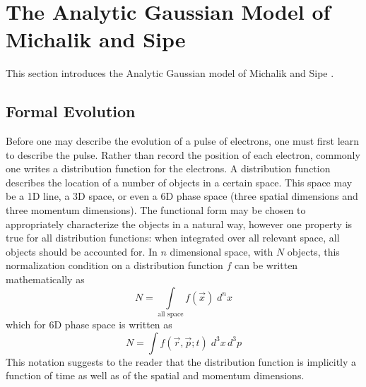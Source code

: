 
\section{The Analytic Gaussian Model of Michalik and Sipe} \label{sec:ms_model}

This section introduces the Analytic Gaussian model of Michalik and Sipe \cite{michalik_analytic_2006}.

\subsection{Formal Evolution} \label{sec:formal_evolution}

Before one may describe the evolution of a pulse of electrons, one must first learn to describe the pulse.
Rather than record the position of each electron, commonly one writes a distribution function for the electrons.
A distribution function describes the location of a number of objects in a certain space.
This space may be a 1D line, a 3D space, or even a 6D phase space (three spatial dimensions and three momentum dimensions).
The functional form may be chosen to appropriately characterize the objects in a natural way, however one property is true for all distribution functions: when integrated over all relevant space, all objects should be accounted for.
In $n$ dimensional space, with $N$ objects, this normalization condition on a distribution function $f$ can be written mathematically as
\begin{equation}
N = \int\limits_{\text{all space}} \!\!\! f(\vec{x}) \; d^{n}x
\end{equation}
which for 6D phase space is written as
\begin{equation} \label{eq:normalization}
N = \int f (\vec{r}, \vec{p}; t) \; d^{3}x\,d^{3}p
\end{equation}
This notation suggests to the reader that the distribution function is implicitly a function of time as well as of the spatial and momentum dimensions.

